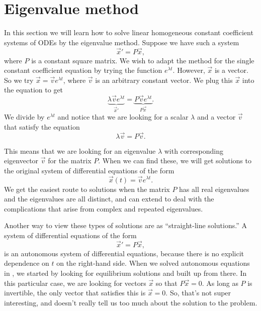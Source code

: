 \section{Eigenvalue method}
\label{eigenmethod:section}



In this section we will learn how to solve linear homogeneous constant
coefficient systems of ODEs by the eigenvalue method.
Suppose we have such a system
\begin{equation*}
{\vec{x}}' = P\vec{x} ,
\end{equation*}
where
$P$ is a
constant square matrix.
We wish to
adapt the method for the single
constant coefficient equation by trying the function $e^{\lambda t}$.
However, $\vec{x}$ is a vector.  So we try $\vec{x} = \vec{v} e^{\lambda t}$, where
$\vec{v}$ is an arbitrary constant vector.  We plug this $\vec{x}$ into the equation to get
\begin{equation*}
\underbrace{\lambda \vec{v} e^{\lambda t}}_{{\vec{x}}'} =
\underbrace{P\vec{v} e^{\lambda t}}_{P\vec{x}} .
\end{equation*}
We divide by $e^{\lambda t}$ and notice that we are looking for a scalar $\lambda$
and a vector $\vec{v}$ that satisfy the equation
\begin{equation*}
\lambda \vec{v} = P\vec{v} .
\end{equation*}

This means that we are looking for an eigenvalue $\lambda$ with corresponding eigenvector $\vec{v}$ for the matrix $P$. When we can find these, we will get solutions to the original system of differential equations of the form \[ \vec{x}(t) = \vec{v}e^{\lambda t}. \] We get the easiest route to solutions when the matrix $P$ has all real eigenvalues and the eigenvalues are all distinct, and can extend to deal with the complications that arise from complex and repeated eigenvalues.  

Another way to view these types of solutions are as ``straight-line solutions.'' A system of differential equations of the form 
\begin{equation*}
{\vec{x}}' = P\vec{x} ,
\end{equation*}
is an autonomous system of differential equations, because there is no explicit dependence on $t$ on the right-hand side. When we solved autonomous equations in , we started by looking for equilibrium solutions and built up from there. In this particular case, we are looking for vectors $\vec{x}$ so that $P\vec{x} = 0$. As long as $P$ is invertible, the only vector that satisfies this is $\vec{x} = 0$. So, that's not super interesting, and doesn't really tell us too much about the solution to the problem.

